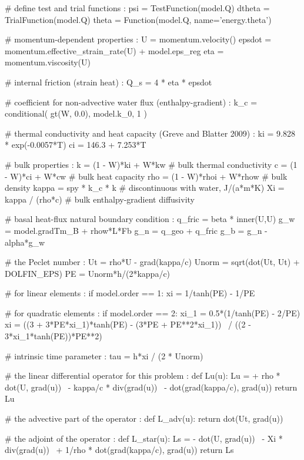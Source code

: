 \begin{python}[label=cslvr_enthalpy, caption={\CSLVR source code contained in the \texttt{Enthalpy} class.}]
# define test and trial functions : 
psi     = TestFunction(model.Q)
dtheta  = TrialFunction(model.Q)
theta   = Function(model.Q, name='energy.theta')
  
# momentum-dependent properties :
U       = momentum.velocity()
epsdot  = momentum.effective_strain_rate(U) + model.eps_reg
eta     = momentum.viscosity(U)
    
# internal friction (strain heat) :
Q_s     = 4 * eta * epsdot

# coefficient for non-advective water flux (enthalpy-gradient) :
k_c     = conditional( gt(W, 0.0), model.k_0, 1 )

# thermal conductivity and heat capacity (Greve and Blatter 2009) :
ki      = 9.828 * exp(-0.0057*T)
ci      = 146.3 + 7.253*T

# bulk properties :
k       =  (1 - W)*ki   + W*kw     # bulk thermal conductivity
c       =  (1 - W)*ci   + W*cw     # bulk heat capacity
rho     =  (1 - W)*rhoi + W*rhow   # bulk density
kappa   =  spy * k_c * k           # discontinuous with water, J/(a*m*K)
Xi      =  kappa / (rho*c)         # bulk enthalpy-gradient diffusivity

# basal heat-flux natural boundary condition :
q_fric  = beta * inner(U,U)
g_w     = model.gradTm_B + rhow*L*Fb
g_n     = q_geo + q_fric
g_b     = g_n - alpha*g_w

# the Peclet number : 
Ut     = rho*U - grad(kappa/c)
Unorm  = sqrt(dot(Ut, Ut) + DOLFIN_EPS)
PE     = Unorm*h/(2*kappa/c)

# for linear elements :
if model.order == 1:
  xi     = 1/tanh(PE) - 1/PE

# for quadratic elements :
if model.order == 2:
  xi_1  = 0.5*(1/tanh(PE) - 2/PE)
  xi    =     ((3 + 3*PE*xi_1)*tanh(PE) - (3*PE + PE**2*xi_1)) \
           /  ((2 - 3*xi_1*tanh(PE))*PE**2)

# intrinsic time parameter :
tau   = h*xi / (2 * Unorm)

# the linear differential operator for this problem :
def Lu(u):
  Lu  = + rho * dot(U, grad(u)) \
        - kappa/c * div(grad(u)) \
        - dot(grad(kappa/c), grad(u))
  return Lu

# the advective part of the operator : 
def L_adv(u):
  return dot(Ut, grad(u))

# the adjoint of the operator :
def L_star(u):
  Ls  = - dot(U, grad(u)) \
        - Xi * div(grad(u)) \
        + 1/rho * dot(grad(kappa/c), grad(u))
  return Ls


\end{python}
